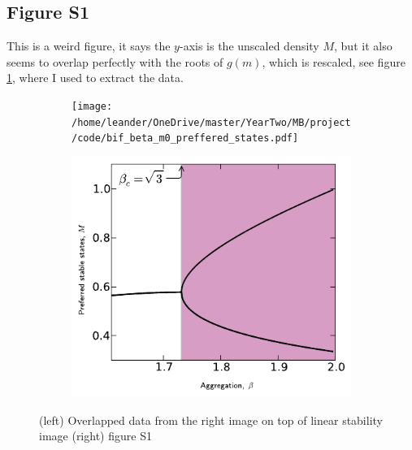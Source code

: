 \documentclass[a4paper]{jpconf}
\begin{document}
\subsection*{Figure S1}
This is a weird figure, it says the $y$-axis is the unscaled density $M$, but it also seems to overlap perfectly with the roots of $g(m)$, which is rescaled, see figure \ref{overlap_preffered}, where I used \cite{Rohatgi2022} to extract the data.
\begin{figure}[h!]
    \centering
    \begin{subfigure}[t]{0.5\textwidth}\centering
        \texttt{[image: /home/leander/OneDrive/master/YearTwo/MB/project/code/bif\_beta\_m0\_preffered\_states.pdf]}

    \end{subfigure}\hfill
    \begin{subfigure}[t]{0.5\textwidth}\centering
        \includegraphics[width=1\linewidth]{preffered_states.pdf}
        
    \end{subfigure}
    \caption{(left) Overlapped data from the right image on top of linear stability image (right) figure S1}\label{overlap_preffered}
\end{figure}
\end{document}
